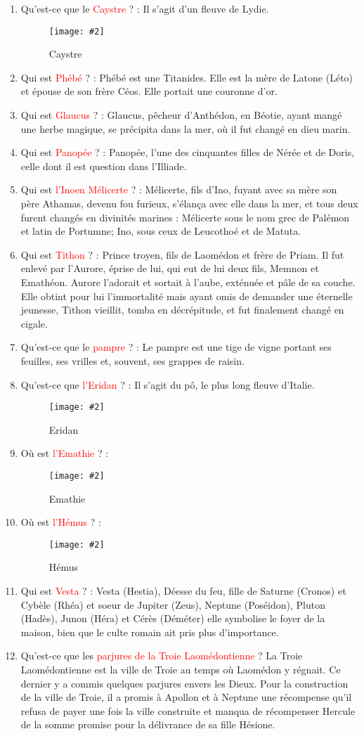 \documentclass[a4paper, 11pt, hidelinks]{article}
\newcommand{\img}[4]{\begin{figure}[!ht]
    \centering
    \texttt{[image: \#2]}
    \caption{#3}
    \label{#4}
    \end{figure} }
\begin{document}
\begin{enumerate}
    \item Qu'est-ce que le \textcolor{red}{Caystre} ? : Il s'agit d'un fleuve de Lydie.
          \img{0.4}{Caystre.png}{Caystre}{46}
    \item Qui est \textcolor{red}{Phébé} ? : Phébé est une Titanides. Elle est la mère de Latone (Léto) et épouse de son frère Céos. Elle portait une couronne d'or.
    \item Qui est \textcolor{red}{Glaucus} ? : Glaucus, pêcheur d'Anthédon, en Béotie, ayant mangé une herbe magique, se précipita dans la mer, où il fut changé en dieu marin.
    \item Qui est \textcolor{red}{Panopée} ? : Panopée, l'une des cinquantes filles de Nérée et de Doris, celle dont il est question dans l'Illiade.
    \item Qui est \textcolor{red}{l'Inoen Mélicerte} ? : Mélicerte, fils d'Ino, fuyant avec sa mère son père Athamas, devenu fou furieux, s'élança avec
          elle dans la mer, et tous deux furent changés en divinités marines : Mélicerte sous le nom grec de Palémon et latin de Portumne; Ino, sous
          ceux de Leucothoé et de Matuta.
    \item Qui est \textcolor{red}{Tithon} ? : Prince troyen, fils de Laomédon et frère de Priam. Il fut enlevé par l'Aurore, éprise de lui, qui eut de lui
          deux fils, Memnon et Emathéon. Aurore l'adorait et sortait à l'aube, exténuée et pâle de sa couche. Elle obtint pour lui l'immortalité mais
          ayant omis de demander une éternelle jeunesse, Tithon vieillit, tomba en décrépitude, et fut finalement changé en cigale.
    \item Qu'est-ce que le \textcolor{red}{pampre} ? : Le pampre est une tige de vigne portant ses feuilles, ses vrilles et, souvent, ses grappes de raisin.
    \item Qu'est-ce que \textcolor{red}{l'Eridan} ? : Il s'agit du pô, le plus long fleuve d'Italie.
          \img{0.5}{Eridan.jpg}{Eridan}{47}
    \item Où est \textcolor{red}{l'Emathie} ? :
          \img{0.3}{Emathie.png}{Emathie}{48}
    \item Où est \textcolor{red}{l'Hémus} ? :
          \img{0.3}{Hémus.png}{Hémus}{49}
    \item Qui est \textcolor{red}{Vesta} ? : Vesta (Hestia), Déesse du feu, fille de Saturne (Cronos) et Cybèle (Rhéa) et soeur de Jupiter (Zeus), Neptune (Poséidon), Pluton (Hadès), Junon (Héra) et
          Cérès (Déméter) elle symbolise le foyer de la maison, bien que le culte romain ait pris plus d’importance.
    \item Qu'est-ce que les \textcolor{red}{parjures de la Troie Laomédontienne} ? La Troie Laomédontienne est la ville de Troie au temps où Laomédon y régnait.
          Ce dernier y a commis quelques parjures envers les Dieux. Pour la construction de la ville de Troie, il a promis à Apollon et à Neptune une récompense
          qu'il refusa de payer une fois la ville construite et manqua de récompenser Hercule de la somme promise pour la délivrance de sa fille Hésione.
\end{enumerate}
\end{document}
